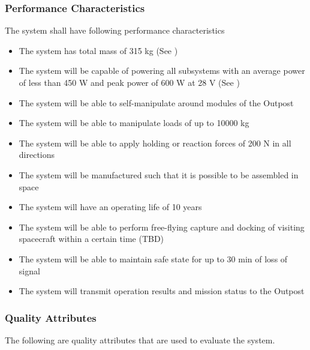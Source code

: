 
\subsubsection{Performance Characteristics}
\label{performance}

The system shall have following performance characteristics

\begin{itemize}
\setlength\itemsep{0px}
\item{The system has total mass of 315 \gls{kg}} (See )
\item{The system will be capable of powering all subsystems with an average power of less than 450 \gls{W} and peak power of 600 \gls{W} at 28 \gls{V}} (See )
\item{The system will be able to self-manipulate around modules of the Outpost}
\item{The system will be able to manipulate loads of up to 10000 \gls{kg} \cite{RFP}}
\item{The system will be able to apply holding or reaction forces of 200 \gls{N} in all directions \cite{RFP}}
\item{The system will be manufactured such that it is possible to be assembled in space}
\item{The system will have an operating life of 10 years \cite{RFP}}
\item{The system will be able to perform free-flying capture and docking of visiting spacecraft within a certain time (\gls{TBD})}
\item{The system will be able to maintain safe state for up to 30 \gls{min} of loss of signal}
\item{The system will transmit operation results and mission status to the Outpost}
\end{itemize}

\subsubsection{Quality Attributes}
\label{quality}
The following are quality attributes that are used to evaluate the system.
%
